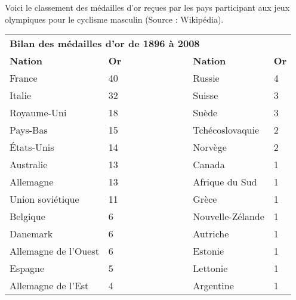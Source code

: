 \documentclass[10pt]{article}
\begin{document}
\setlength\parindent{0mm}
\pagestyle{fancy}
\thispagestyle{empty}
    
    
    




\medskip

Voici le classement des médailles d'or reçues par les pays participant aux jeux olympiques pour le cyclisme masculin (Source : Wikipédia). 
 
\begin{tabularx}{\linewidth}{|l X|l|l X|}
\multicolumn{5}{l}{\textbf{Bilan des médailles d'or de 1896 à 2008}}\\ \cline{1-2}\cline{4-5}
\textbf{Nation}&\textbf{Or}&&\textbf{Nation}&\textbf{Or}\\
France				&40&~~~~~~~~~~~	& Russie	& 	4\\ 
Italie				&32&	&Suisse 	&	3\\ 
Royaume-Uni			&18&	&Suède		& 	3 \\
Pays-Bas 			&15&	&Tchécoslovaquie& 	2\\
États-Unis 			&14&	&Norvège	& 	2\\
Australie 			&13&	&Canada		& 	1\\
Allemagne 			&13&	&Afrique du Sud &1\\
Union soviétique	&11&	&Grèce		&1\\
Belgique 			&6&	&Nouvelle-Zélande&1\\ 
Danemark 			&6&	&Autriche	&1\\
Allemagne de l'Ouest&6&	&Estonie	&1 \\
Espagne 			&5&	&Lettonie	&1\\ 
Allemagne de l'Est	&4&	&Argentine	&1\\ \cline{1-2}\cline{4-5}
\end{tabularx}
\end{document}

